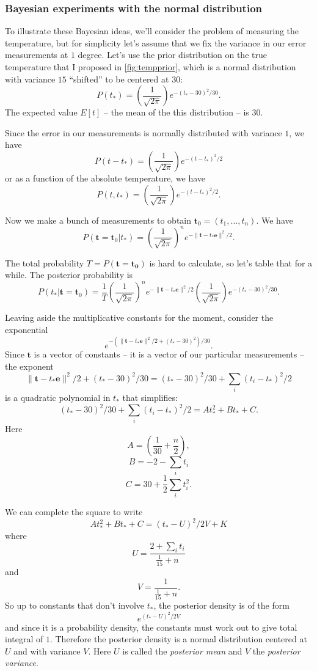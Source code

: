 \documentclass[
]{article}
\begin{document}
\hypertarget{bayesian-experiments-with-the-normal-distribution}{%
\subsubsection{Bayesian experiments with the normal
distribution}\label{bayesian-experiments-with-the-normal-distribution}}

To illustrate these Bayesian ideas, we'll consider the problem of
measuring the temperature, but for simplicity let's assume that we fix
the variance in our error measurements at \(1\) degree. Let's use the
prior distribution on the true temperature that I proposed in
\cref{fig:tempprior}, which is a normal distribution with variance
\(15\) ``shifted'' to be centered at \(30\): \[
P(t_*)=\left(\frac{1}{\sqrt{2\pi}}\right)e^{-(t_*-30)^2/30}.
\] The expected value \(E[t]\) -- the mean of the this distribution --
is \(30\).

Since the error in our measurements is normally distributed with
variance \(1\), we have \[
P(t-t_{*})=\left(\frac{1}{\sqrt{2\pi}}\right)e^{-(t-t_{*})^2/2}
\] or as a function of the absolute temperature, we have \[
P(t,t_{*}) = \left(\frac{1}{\sqrt{2\pi}}\right)e^{-(t-t_*)^2/2}.
\]

Now we make a bunch of measurements to obtain
\(\mathbf{t}_0=(t_1,\ldots, t_n)\). We have \[
P(\mathbf{t}=\mathbf{t}_0|t_{*}) = \left(\frac{1}{\sqrt{2\pi}}\right)^ne^{-\|\mathbf{t}-t_*\mathbf{e}\|^2/2}.
\]

The total probability \(T=P(\mathbf{t}=\mathbf{t_0})\) is hard to
calculate, so let's table that for a while. The posterior probability is
\[
P(t_{*}|\mathbf{t}=\mathbf{t}_{0}) = \frac{1}{T} 
\left(\frac{1}{\sqrt{2\pi}}\right)^ne^{-\|\mathbf{t}-t_*\mathbf{e}\|^2/2}
\left(\frac{1}{\sqrt{2\pi}}\right)e^{-(t_*-30)^2/30}.
\]

Leaving aside the multiplicative constants for the moment, consider the
exponential \[
e^{-(\|\mathbf{t}-t_{*}\mathbf{e}\|^2/2+(t_{*}-30)^2)/30}.
\] Since \(\mathbf{t}\) is a vector of constants -- it is a vector of
our particular measurements -- the exponent \[
\|\mathbf{t}-t_{*}\mathbf{e}\|^2/2+(t_{*}-30)^2/30 = (t_{*}-30)^2/30+\sum_{i} (t_{i}-t_{*})^2/2
\] is a quadratic polynomial in \(t_{*}\) that simplifies: \[
(t_{*}-30)^2/30+\sum_{i} (t_{i}-t_{*})^2/2 = At_{*}^2+Bt_{*}+C.
\] Here \[
A=(\frac{1}{30}+\frac{n}{2}),
\] \[
B=-2-\sum_{i} t_{i}
\] \[
C=30+\frac{1}{2}\sum_{i} t_{i}^2.
\]

We can complete the square to write \[
At_{*}^2+Bt_{*}+C = (t_{*}-U)^2/2V +K
\] where \[
U=\frac{2+\sum_{i}t_{i}}{\frac{1}{15}+n}
\] and \[ 
V=\frac{1}{\frac{1}{15}+n}.
\] So up to constants that don't involve \(t_{*}\), the posterior
density is of the form \[
e^{(t_{*}-U)^2/2V}
\] and since it is a probability density, the constants must work out to
give total integral of \(1\). Therefore the posterior density is a
normal distribution centered at \(U\) and with variance \(V\). Here
\(U\) is called the \emph{posterior mean} and \(V\) the \emph{posterior
variance}.
\end{document}
